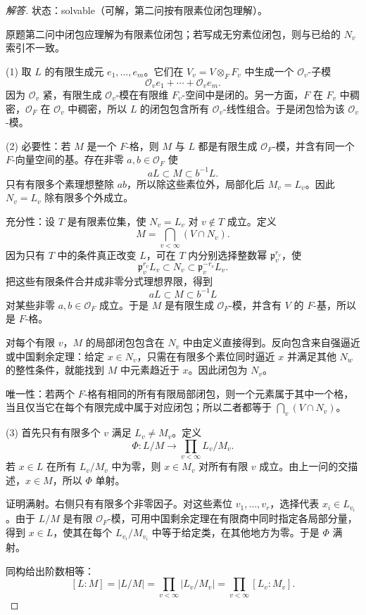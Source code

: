 \documentclass[11pt,a4paper,openany]{ctexbook}
\numberwithin{equation}{chapter}
\theoremstyle{plain}
\theoremstyle{definition}
\theoremstyle{remark}
\begin{document}
\begin{proof}[解答]
状态：solvable（可解，第二问按有限素位闭包理解）。

原题第二问中闭包应理解为有限素位闭包；若写成无穷素位闭包，则与已给的 $N_v$ 索引不一致。

(1) 取 $L$ 的有限生成元 $e_1,\ldots,e_m$。它们在 $V_v=V\otimes_FF_v$ 中生成一个 $\mathcal O_v$-子模
\[
 \mathcal O_ve_1+\cdots+\mathcal O_ve_m.
\]
因为 $\mathcal O_v$ 紧，有限生成 $\mathcal O_v$-模在有限维 $F_v$-空间中是闭的。另一方面，$F$ 在 $F_v$ 中稠密，$\mathcal O_F$ 在 $\mathcal O_v$ 中稠密，所以 $L$ 的闭包包含所有 $\mathcal O_v$-线性组合。于是闭包恰为该 $\mathcal O_v$-模。

(2) 必要性：若 $M$ 是一个 $F$-格，则 $M$ 与 $L$ 都是有限生成 $\mathcal O_F$-模，并含有同一个 $F$-向量空间的基。存在非零 $a,b\in\mathcal O_F$ 使
\[
 aL\subset M\subset b^{-1}L.
\]
只有有限多个素理想整除 $ab$，所以除这些素位外，局部化后 $M_v=L_v$。因此 $N_v=L_v$ 除有限多个外成立。

充分性：设 $T$ 是有限素位集，使 $N_v=L_v$ 对 $v\notin T$ 成立。定义
\[
 M=\bigcap_{v<\infty}(V\cap N_v).
\]
因为只有 $T$ 中的条件真正改变 $L$，可在 $T$ 内分别选择整数幂 $\mathfrak p_v^{r_v}$，使
\[
 \mathfrak p_v^{r_v}L_v\subset N_v\subset \mathfrak p_v^{-r_v}L_v.
\]
把这些有限条件合并成非零分式理想界限，得到
\[
 aL\subset M\subset b^{-1}L
\]
对某些非零 $a,b\in\mathcal O_F$ 成立。于是 $M$ 是有限生成 $\mathcal O_F$-模，并含有 $V$ 的 $F$-基，所以是 $F$-格。

对每个有限 $v$，$M$ 的局部闭包包含在 $N_v$ 中由定义直接得到。反向包含来自强逼近或中国剩余定理：给定 $x\in N_v$，只需在有限多个素位同时逼近 $x$ 并满足其他 $N_w$ 的整性条件，就能找到 $M$ 中元素趋近于 $x$。因此闭包为 $N_v$。

唯一性：若两个 $F$-格有相同的所有有限局部闭包，则一个元素属于其中一个格，当且仅当它在每个有限完成中属于对应闭包；所以二者都等于 $\bigcap_v(V\cap N_v)$。

(3) 首先只有有限多个 $v$ 满足 $L_v\ne M_v$。定义
\[
 \Phi:L/M\to\prod_{v<\infty}L_v/M_v.
\]
若 $x\in L$ 在所有 $L_v/M_v$ 中为零，则 $x\in M_v$ 对所有有限 $v$ 成立。由上一问的交描述，$x\in M$，所以 $\Phi$ 单射。

证明满射。右侧只有有限多个非零因子。对这些素位 $v_1,\ldots,v_r$，选择代表 $x_i\in L_{v_i}$。由于 $L/M$ 是有限 $\mathcal O_F$-模，可用中国剩余定理在有限商中同时指定各局部分量，得到 $x\in L$，使其在每个 $L_{v_i}/M_{v_i}$ 中等于给定类，在其他地方为零。于是 $\Phi$ 满射。

同构给出阶数相等：
\[
 [L:M]=|L/M|
 =\prod_{v<\infty}|L_v/M_v|
 =\prod_{v<\infty}[L_v:M_v].
\]
\end{proof}
\end{document}
